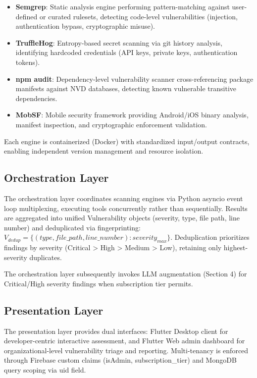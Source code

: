\documentclass[10pt, conference, compsocconf]{IEEEtran}
\begin{document}
\begin{itemize}
  \item \textbf{Semgrep}: Static analysis engine performing pattern-matching against user-defined or curated rulesets, detecting code-level vulnerabilities (injection, authentication bypass, cryptographic misuse).
  
  \item \textbf{TruffleHog}: Entropy-based secret scanning via git history analysis, identifying hardcoded credentials (API keys, private keys, authentication tokens).
  
  \item \textbf{npm audit}: Dependency-level vulnerability scanner cross-referencing package manifests against NVD databases, detecting known vulnerable transitive dependencies.
  
  \item \textbf{MobSF}: Mobile security framework providing Android/iOS binary analysis, manifest inspection, and cryptographic enforcement validation.
\end{itemize}

Each engine is containerized (Docker) with standardized input/output contracts, enabling independent version management and resource isolation.

\subsection{Orchestration Layer}

The orchestration layer coordinates scanning engines via Python asyncio event loop multiplexing, executing tools concurrently rather than sequentially. Results are aggregated into unified Vulnerability objects (severity, type, file path, line number) and deduplicated via fingerprinting: $V_{dedup} = \{(type, file\_path, line\_number) : severity_{max}\}$. Deduplication prioritizes findings by severity (Critical > High > Medium > Low), retaining only highest-severity duplicates.

The orchestration layer subsequently invokes LLM augmentation (Section 4) for Critical/High severity findings when subscription tier permits.

\subsection{Presentation Layer}

The presentation layer provides dual interfaces: Flutter Desktop client for developer-centric interactive assessment, and Flutter Web admin dashboard for organizational-level vulnerability triage and reporting. Multi-tenancy is enforced through Firebase custom claims (isAdmin, subscription\_tier) and MongoDB query scoping via uid field.
\end{document}
